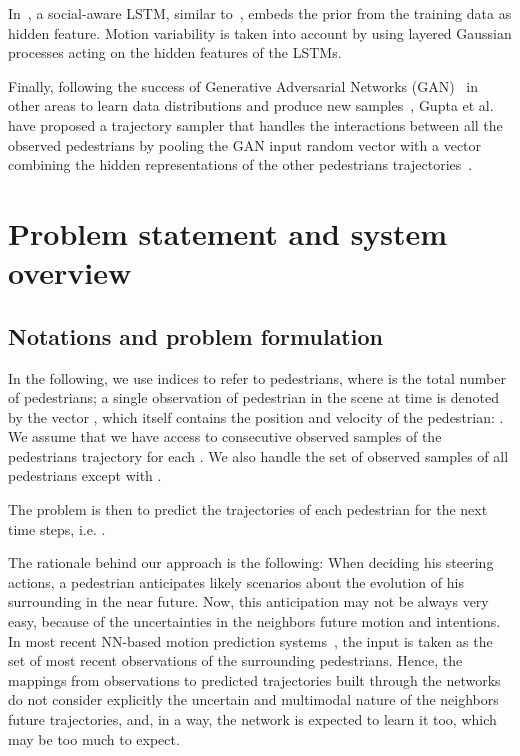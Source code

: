 \documentclass[10pt,twocolumn,letterpaper]{article}
\begin{document}
In~\cite{PlausiblePaths2017}, a social-aware LSTM, similar to~\cite{SocialLSTM2016}, embeds the prior from the training data as hidden feature. Motion variability is taken into account by using layered Gaussian processes acting on the hidden features of the LSTMs.

Finally, following the success of Generative Adversarial Networks (GAN)~\cite{Goodfellow2014} in other areas to learn data distributions and produce new samples~\cite{BEGAN2017}, Gupta et al. have proposed a trajectory sampler that handles the interactions between all the observed pedestrians by pooling the GAN input random vector with a vector combining the hidden representations of the other pedestrians trajectories~\cite{SocialGAN2018}.

\section{Problem statement and system overview}


\def \xObsv {\mathbf{x}^i_{-\tau: 0}}
\def \xPred {\mathbf{x}^i_{1: T}}
\def \XObsv {\mathbf{X}^{-i}_{-\tau: 0}}
\def \XPred {\mathbf{X}^{-i}_{1: T}}

\def \xPredH {\mathbf{\hat{x}}^i_{1: T}}
\def \XPredH {\mathbf{\hat{X}}^{-i}_{1: T}}

\def \TEOM {\mathbf{\hat{m}}^i_{1: T}}
 
\subsection{Notations and problem formulation} 

In the following, we use indices  to refer to pedestrians, where  is the total number of pedestrians; a single observation of pedestrian  in the scene at time  is denoted by the  vector , which itself contains the position  and velocity  of the pedestrian: 
.  We assume that we have access to  
consecutive observed samples  of the pedestrians trajectory
for each . 
We also handle the set of observed samples of all pedestrians except  with 
.

The problem is then to predict the trajectories of each pedestrian for the next  time steps, i.e. . 

The rationale behind our approach is the following: When deciding his steering actions, a pedestrian anticipates likely scenarios about the evolution of his surrounding in the near future. Now, this anticipation may not be always very easy, because of the uncertainties in the neighbors future motion and intentions. In most recent NN-based motion prediction systems~\cite{SocialAttention2018Vemula,CIDNN2018,Pfeiffer2018}, the input is taken as the set of most recent observations of the surrounding pedestrians. Hence, the mappings from observations to predicted trajectories built through the networks do not consider explicitly the uncertain and multimodal nature of the neighbors future trajectories, and, in a way, the network is expected to learn it too, which may be too much to expect.   
\end{document}

